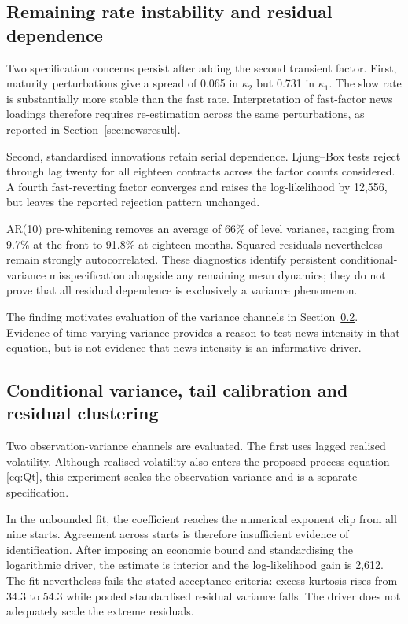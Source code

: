 \documentclass[journal]{IEEEtran}
\begin{document}
\subsection{Remaining rate instability and residual dependence}
\label{sec:openfindings}

Two specification concerns persist after adding the second transient factor. First, maturity perturbations give a spread of 0.065 in $\kappa_2$ but 0.731 in $\kappa_1$. The slow rate is substantially more stable than the fast rate. Interpretation of fast-factor news loadings therefore requires re-estimation across the same perturbations, as reported in Section~\ref{sec:newsresult}.

Second, standardised innovations retain serial dependence. Ljung--Box tests reject through lag twenty for all eighteen contracts across the factor counts considered. A fourth fast-reverting factor converges and raises the log-likelihood by 12{,}556, but leaves the reported rejection pattern unchanged.

AR(10) pre-whitening removes an average of 66\% of level variance, ranging from 9.7\% at the front to 91.8\% at eighteen months. Squared residuals nevertheless remain strongly autocorrelated. These diagnostics identify persistent conditional-variance misspecification alongside any remaining mean dynamics; they do not prove that all residual dependence is exclusively a variance phenomenon.

The finding motivates evaluation of the variance channels in Section~\ref{sec:varchannels}. Evidence of time-varying variance provides a reason to test news intensity in that equation, but is not evidence that news intensity is an informative driver.

\subsection{Conditional variance, tail calibration and residual clustering}
\label{sec:varchannels}

Two observation-variance channels are evaluated. The first uses lagged realised volatility. Although realised volatility also enters the proposed process equation \eqref{eq:Qt}, this experiment scales the observation variance and is a separate specification.

In the unbounded fit, the coefficient reaches the numerical exponent clip from all nine starts. Agreement across starts is therefore insufficient evidence of identification. After imposing an economic bound and standardising the logarithmic driver, the estimate is interior and the log-likelihood gain is 2{,}612. The fit nevertheless fails the stated acceptance criteria: excess kurtosis rises from 34.3 to 54.3 while pooled standardised residual variance falls. The driver does not adequately scale the extreme residuals.
\end{document}

